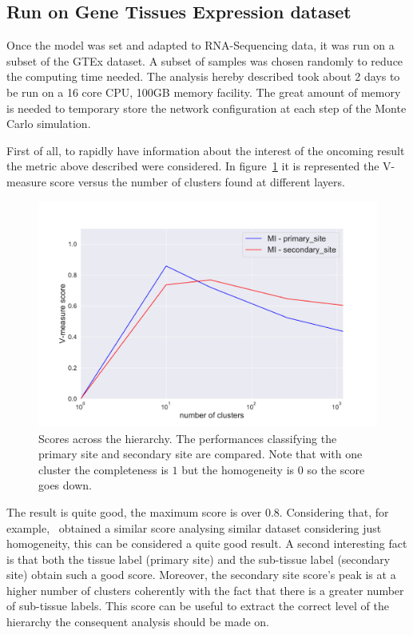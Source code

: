 \subsection{Run on Gene Tissues Expression dataset}
Once the model was set and adapted to RNA-Sequencing data, it was run on a subset of the GTEx dataset. A subset of samples was chosen randomly to reduce the computing time needed. The analysis hereby described took about 2 days to be run on a 16 core CPU, 100GB memory facility. The great amount of memory is needed to temporary store the network configuration at each step of the Monte Carlo simulation.

First of all, to rapidly have information about the interest of the oncoming result the metric above described were considered. In figure~\ref{fig:topic/gtex/oversigma_10tissue/metric_scores} it is represented the V-measure score versus the number of clusters found at different layers.
\begin{figure}[htb!]
    \centering
    \includegraphics[width=0.9\linewidth]{pictures/topic/gtex/oversigma_10tissue/metric_scores.pdf}
    \caption{Scores across the hierarchy. The performances classifying the primary site and secondary site are compared. Note that with one cluster the completeness is $1$ but the homogeneity is $0$ so the score goes down.}
    \label{fig:topic/gtex/oversigma_10tissue/metric_scores}
\end{figure}
The result is quite good, the maximum score is over $0.8$. Considering that, for example,~\cite{Farver2018} obtained a similar score analysing similar dataset considering just homogeneity, this can be considered a quite good result. A second interesting fact is that both the tissue label (primary site) and the sub-tissue label (secondary site) obtain such a good score. Moreover, the secondary site score's peak is at a higher number of clusters coherently with the fact that there is a greater number of sub-tissue labels. This score can be useful to extract the correct level of the hierarchy the consequent analysis should be made on.

